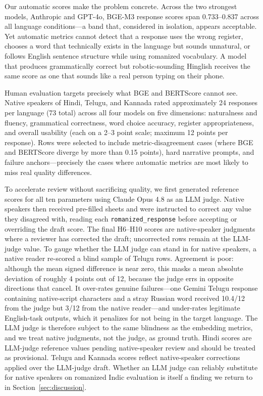 Our automatic scores make the problem concrete. Across the two strongest
models, Anthropic and GPT-4o, BGE-M3 response scores span 0.733--0.837 across
all language conditions---a band that, considered in isolation, appears
acceptable. Yet automatic metrics cannot detect that a response uses the wrong
register, chooses a word that technically exists in the language but sounds
unnatural, or follows English sentence structure while using romanized
vocabulary. A model that produces grammatically correct but robotic-sounding
Hinglish receives the same score as one that sounds like a real person typing
on their phone.

Human evaluation targets precisely what BGE and BERTScore cannot see. Native
speakers of Hindi, Telugu, and Kannada rated approximately 24 responses per
language (73 total) across all four models on five dimensions: naturalness and
fluency, grammatical correctness, word choice accuracy, register
appropriateness, and overall usability (each on a 2--3 point scale; maximum
12 points per response). Rows were selected to include metric-disagreement
cases (where BGE and BERTScore diverge by more than 0.15 points), hard
narrative prompts, and failure anchors---precisely the cases where automatic
metrics are most likely to miss real quality differences.

\enspace
To accelerate review without sacrificing quality, we first generated reference
scores for all ten parameters using Claude Opus 4.8 as an LLM judge. Native
speakers then received pre-filled sheets and were instructed to correct any
value they disagreed with, reading each \texttt{romanized\_response} before
accepting or overriding the draft score. The final H6--H10 scores are native-speaker judgments where a reviewer has
corrected the draft; uncorrected rows remain at the LLM-judge value. To gauge
whether the LLM judge can stand in for native speakers, a native reader
re-scored a blind sample of Telugu rows. Agreement is poor: although the mean
signed difference is near zero, this masks a mean absolute deviation of roughly
4 points out of 12, because the judge errs in opposite directions that cancel.
It over-rates genuine failures---one Gemini Telugu response containing
native-script characters and a stray Russian word received 10.4/12 from the
judge but 3/12 from the native reader---and under-rates legitimate
English-task outputs, which it penalizes for not being in the target language.
The LLM judge is therefore subject to the same blindness as the embedding
metrics, and we treat native judgments, not the judge, as ground truth. Hindi
scores are LLM-judge reference values pending native-speaker review and should
be treated as provisional. Telugu and Kannada scores reflect native-speaker
corrections applied over the LLM-judge draft. Whether an LLM judge can
reliably substitute for native speakers on romanized Indic evaluation is itself
a finding we return to in Section~\ref{sec:discussion}.

